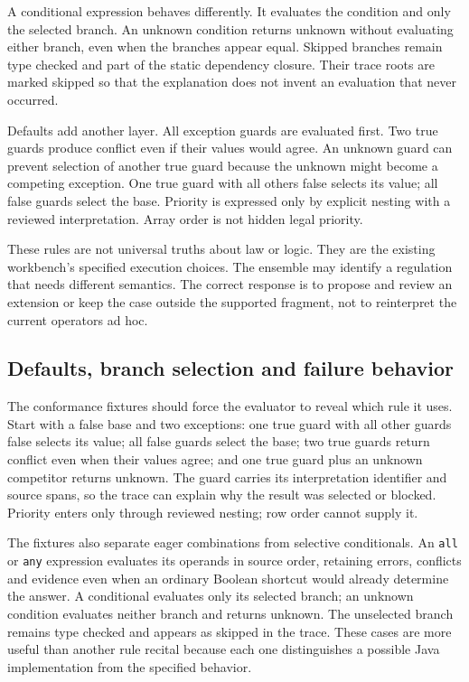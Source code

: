 A conditional expression behaves differently. It evaluates the condition and
only the selected branch. An unknown condition returns unknown without evaluating
either branch, even when the branches appear equal. Skipped branches remain type
checked and part of the static dependency closure. Their trace roots are marked
skipped so that the explanation does not invent an evaluation that never occurred.

Defaults add another layer. All exception guards are evaluated first. Two true
guards produce conflict even if their values would agree. An unknown guard can
prevent selection of another true guard because the unknown might become a
competing exception. One true guard with all others false selects its value; all
false guards select the base. Priority is expressed only by explicit nesting with
a reviewed interpretation. Array order is not hidden legal priority.

These rules are not universal truths about law or logic. They are the existing
workbench's specified execution choices. The ensemble may identify a regulation
that needs different semantics. The correct response is to propose and review an
extension or keep the case outside the supported fragment, not to reinterpret
the current operators ad hoc.

\subsection{Defaults, branch selection and failure behavior}
\label{merge:P-03a-rule-contract:02}


The conformance fixtures should force the evaluator to reveal which rule it uses. Start
with a false base and two exceptions: one true guard with all other guards false selects
its value; all false guards select the base; two true guards return conflict even when
their values agree; and one true guard plus an unknown competitor returns unknown. The
guard carries its interpretation identifier and source spans, so the trace can explain
why the result was selected or blocked. Priority enters only through reviewed nesting;
row order cannot supply it.

The fixtures also separate eager combinations from selective conditionals. An \texttt{all} or \texttt{any}
expression evaluates its operands in source order, retaining
errors, conflicts and evidence even when an ordinary Boolean shortcut would already
determine the answer. A conditional evaluates only its selected branch; an unknown
condition evaluates neither branch and returns unknown. The unselected branch remains
type checked and appears as skipped in the trace. These cases are more useful than another rule
recital because each one distinguishes a possible Java implementation
from the specified behavior.


